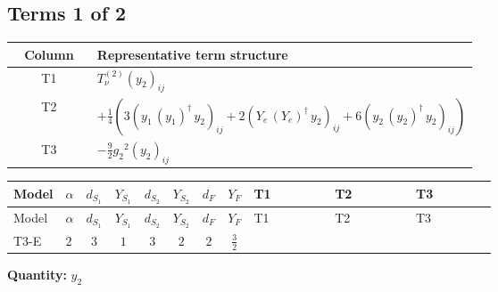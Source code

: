 \documentclass[8pt]{article}
\begin{document}
\begin{landscape}
\subsection*{Terms 1 of 2}
\begin{center}
\begin{tabular}{@{}c >{\raggedright\arraybackslash}p{0.82\linewidth}@{}}
\toprule
Column & Representative term structure \\
\midrule
T1 & \(\displaystyle T_{\nu}^{(2)} \left({y_2}\right)_{ij}\) \\
\midrule
T2 & \(\displaystyle +\frac{1}{4} (3 \left({y_1}\,\left({y_1}\right)^{\dagger}\,{y_2}\right)_{ij}+2 \left({Y_e}\,\left({Y_e}\right)^{\dagger}\,{y_2}\right)_{ij}+6 \left({y_2}\,\left({y_2}\right)^{\dagger}\,{y_2}\right)_{ij})\) \\
\midrule
T3 & \(\displaystyle -\frac{9}{2} {g_2}^2 \left({y_2}\right)_{ij}\) \\
\midrule
\bottomrule
\end{tabular}
\end{center}
\smallskip
\tiny
\begin{longtable}{@{}llcccccc >{\raggedright\arraybackslash}p{0.21\linewidth} >{\raggedright\arraybackslash}p{0.21\linewidth} >{\raggedright\arraybackslash}p{0.21\linewidth}@{}}
\toprule
Model & $\alpha$ & $d_{S_1}$ & $Y_{S_1}$ & $d_{S_2}$ & $Y_{S_2}$ & $d_F$ & $Y_F$ & T1 & T2 & T3 \\
\midrule
\endfirsthead
\toprule
Model & $\alpha$ & $d_{S_1}$ & $Y_{S_1}$ & $d_{S_2}$ & $Y_{S_2}$ & $d_F$ & $Y_F$ & T1 & T2 & T3 \\
\midrule
\endhead
T3-E & $2$ & $3$ & $1$ & $3$ & $2$ & $2$ & $\frac{3}{2}$ & \scriptsize\adjustbox{max width=\linewidth}{$\begin{gathered} T_{\nu}^{(2)} \left({y_2}\right)_{ij}\end{gathered}$} & \scriptsize\adjustbox{max width=\linewidth}{$\begin{gathered} +\frac{1}{4} (3 \left({y_1}\,\left({y_1}\right)^{\dagger}\,{y_2}\right)_{ij}+2 \left({Y_e}\,\left({Y_e}\right)^{\dagger}\,{y_2}\right)_{ij}+6 \left({y_2}\,\left({y_2}\right)^{\dagger}\,{y_2}\right)_{ij})\end{gathered}$} & \scriptsize\adjustbox{max width=\linewidth}{$\begin{gathered} -\frac{9}{2} {g_2}^2 \left({y_2}\right)_{ij}\end{gathered}$} \\
\midrule
\bottomrule
\end{longtable}
\clearpage
\noindent\textbf{Quantity: }$y_2$\par\smallskip

\end{landscape}
\end{document}
